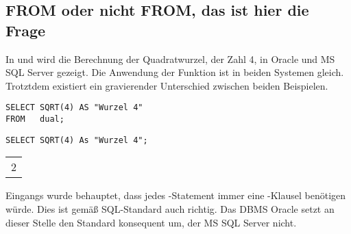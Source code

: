       \subsection{FROM oder nicht FROM, das ist hier die Frage}
        In  und  wird die Berechnung der
        Quadratwurzel, der Zahl 4, in Oracle und MS SQL Server gezeigt. Die
        Anwendung der Funktion  ist in beiden Systemen
        gleich. Trotztdem existiert ein gravierender Unterschied zwischen beiden
        Beispielen.
        \begin{lstlisting}[language=oracle_sql,caption={Berechnung der Quadartwurzel, der Zahl 4, in Oracle},label=sql03_12]
SELECT SQRT(4) AS "Wurzel 4"
FROM   dual;
        \end{lstlisting}
        \begin{lstlisting}[language=ms_sql,caption={Berechnung der Quadratwurzel, der Zahl 4, in MS SQL Server},label=sql03_13]
SELECT SQRT(4) As "Wurzel 4";
        \end{lstlisting}
        \begin{center}
          \begin{small}
            \tablehead{}
            \begin{msoraclesql}
              \begin{supertabular}{r}
                2 \\
              \end{supertabular}
            \end{msoraclesql}
          \end{small}
        \end{center}
        Eingangs wurde behauptet, dass jedes \SELECT-Statement immer eine
        \FROM-Klausel benötigen würde. Dies ist gemäß SQL-Standard
        auch richtig. Das DBMS Oracle setzt an dieser Stelle den Standard
        konsequent um, der MS SQL Server nicht.


